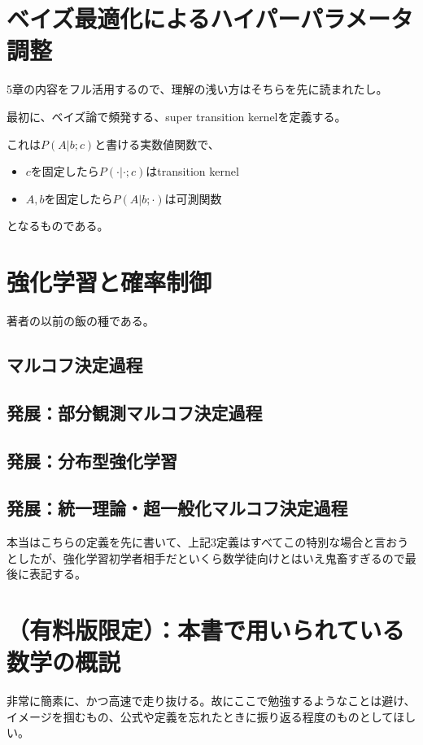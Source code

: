 \documentclass{jsarticle}
\begin{document}
\section{ベイズ最適化によるハイパーパラメータ調整}

5章の内容をフル活用するので、理解の浅い方はそちらを先に読まれたし。

最初に、ベイズ論で頻発する、super transition kernelを定義する。

これは$P(A|b;c)$と書ける実数値関数で、

\begin{itemize}
\item $c$を固定したら$P(\cdot|\cdot;c)$はtransition kernel
\item $A,b$を固定したら$P(A|b;\cdot)$は可測関数
\end{itemize}

となるものである。




\newpage

\section{強化学習と確率制御}
著者の以前の飯の種である。
\subsection{マルコフ決定過程}



\subsection{発展：部分観測マルコフ決定過程}




\subsection{発展：分布型強化学習}


\subsection{発展：統一理論・超一般化マルコフ決定過程}
本当はこちらの定義を先に書いて、上記3定義はすべてこの特別な場合と言おうとしたが、強化学習初学者相手だといくら数学徒向けとはいえ鬼畜すぎるので最後に表記する。





\newpage
\section{（有料版限定）：本書で用いられている数学の概説}
非常に簡素に、かつ高速で走り抜ける。故にここで勉強するようなことは避け、イメージを掴むもの、公式や定義を忘れたときに振り返る程度のものとしてほしい。
\end{document}
